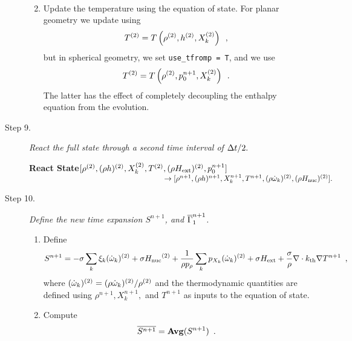 \begin{description}
\begin{enumerate}
\begin{eqnarray}
\end{eqnarray}
\item Update the temperature using the equation of state.  For planar geometry we
update using
\begin{equation}
T^{(2)} = T\left(\rho^{(2)}, h^{(2)}, X_k^{(2)}\right) \enskip ,
\end{equation}
but in spherical geometry, we set {\tt use\_tfromp = T}, and we use
\begin{equation}
T^{(2)} = T\left(\rho^{(2)}, p_0^{n+1}, X_k^{(2)}\right) \enskip .
\end{equation}
The latter has the effect of completely decoupling the enthalpy equation from the 
evolution.

\end{enumerate}

\item[Step 9.] {\em React the full state through a second time interval of $\Delta t / 2.$}

{\bf React State}$[\rho^{(2)},(\rho h)^{(2)}, X_k^{(2)},T^{(2)}, (\rho{H_{\rm ext}})^{(2)}, p_0^{n+1}]$\\
$~~~~~~~~~~~~~~~~~~~~~~~~~~~~~~~~~~~~~~~~~~~~~~~~~~~~~~\rightarrow [\rho^{n+1}, 
(\rho h)^{n+1}, X_k^{n+1}, T^{n+1}, (\rho \dot{\omega}_k)^{(2)}, (\rho {H_{\rm nuc}})^{(2)} ].$  


\item[Step 10.] {\em Define the new time expansion $S^{n+1}$, and $\overline{\Gamma}_1^{n+1}$.}

\begin{enumerate}
\renewcommand{\theenumi}{{\bf \alph{enumi}}}
\item Define
\begin{equation}
  S^{n+1} =  -\sigma  \sum_k  \xi_k (\dot{\omega}_k)^{(2)}  + \sigma {H_{\rm nuc}}^{(2)} +
  \frac{1}{\rho p_\rho} \sum_k p_{X_k}  ({\dot{\omega}}_k)^{(2)}  
   + \sigma {H_{\rm ext}} + \frac{\sigma}{\rho}\nabla\cdot k_{\rm th}\nabla T^{n+1} \enskip ,
\end{equation}
where $(\dot{\omega}_k)^{(2)} = (\rho \dot{\omega}_k)^{(2)} / \rho^{(2)}$
and the thermodynamic quantities are defined using $\rho^{n+1}, X_k^{n+1},$
and $T^{n+1}$ as inputs to the equation of state.

\item Compute
\begin{equation}
\overline{S^{n+1}} = {\mathrm{\bf Avg}} (S^{n+1}) \enskip.
\end{equation}


\end{enumerate}
\end{description}
